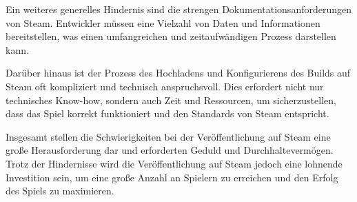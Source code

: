 Ein weiteres generelles Hindernis sind die strengen Dokumentationsanforderungen von Steam.
Entwickler müssen eine Vielzahl von Daten und Informationen bereitstellen, was einen umfangreichen und zeitaufwändigen Prozess darstellen kann.

Darüber hinaus ist der Prozess des Hochladens und Konfigurierens des Builds auf Steam oft kompliziert und technisch anspruchsvoll.
Dies erfordert nicht nur technisches Know-how, sondern auch Zeit und Ressourcen, um sicherzustellen, dass das Spiel korrekt funktioniert und den Standards von Steam entspricht.

Insgesamt stellen die Schwierigkeiten bei der Veröffentlichung auf Steam eine große Herausforderung dar und erforderten Geduld und Durchhaltevermögen.
Trotz der Hindernisse wird die Veröffentlichung auf Steam jedoch eine lohnende Investition sein, um eine große Anzahl an Spielern zu erreichen und den Erfolg des Spiels zu maximieren.

\renewcommand{\kapitelautor}{}
